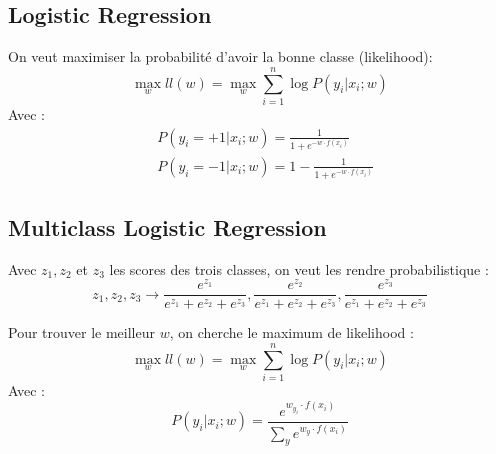 \subsection{Logistic Regression}
\label{sub:logistic_regression}
On veut maximiser la probabilité d'avoir la bonne classe (likelihood):
\begin{equation*}
    \max_w ll(w) = \max_w \sum_{i=1}^{n} \log P(y_i|x_i;w)
\end{equation*}
Avec :
\begin{equation*}
    \begin{aligned}
        &P(y_i = +1|x_i;w) = \frac{1}{1+e^{-w\cdot f(x_i)}}\\
        &P(y_i = -1|x_i;w) = 1 - \frac{1}{1+e^{-w\cdot f(x_i)}}
    \end{aligned}
\end{equation*}


\subsection{Multiclass Logistic Regression}
\label{sub:multiclass_logistic_regression}
Avec $z_1,z_2$ et $z_3$ les scores des trois classes, on veut les rendre probabilistique :
\begin{equation*}
    z_1,z_2,z_3 \rightarrow \frac{e^{z_1}}{e^{z_1}+e^{z_2}+e^{z_3}}, \frac{e^{z_2}}{e^{z_1}+e^{z_2}+e^{z_3}}, \frac{e^{z_3}}{e^{z_1}+e^{z_2}+e^{z_3}}
\end{equation*}

Pour trouver le meilleur $w$, on cherche le maximum de likelihood :
\begin{equation*}
    \max_w ll(w) = \max_w \sum_{i=1}^{n} \log P(y_i|x_i;w)
\end{equation*}
Avec :
\begin{equation*}
    P(y_i|x_i;w) = \frac{e^{w_{y_i}\cdot f(x_i)}}{\sum_{y} e^{w_{y}\cdot f(x_i)}}
\end{equation*}